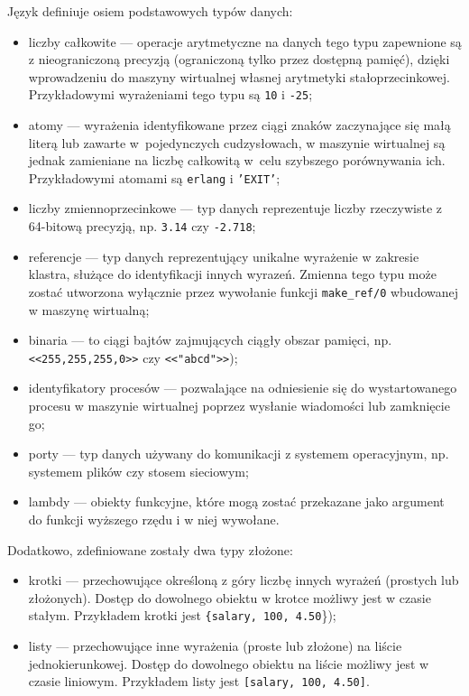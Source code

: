 Język definiuje osiem podstawowych typów danych:
\begin{itemize}
\item liczby całkowite --- operacje arytmetyczne na danych tego typu zapewnione są z nieograniczoną precyzją (ograniczoną tylko przez dostępną pamięć), dzięki wprowadzeniu do maszyny wirtualnej własnej arytmetyki stałoprzecinkowej. Przykładowymi wyrażeniami tego typu są \texttt{10} i \texttt{-25};
\item atomy --- wyrażenia identyfikowane przez ciągi znaków zaczynające się małą literą lub zawarte w~pojedynczych cudzysłowach, w maszynie wirtualnej są jednak zamieniane na liczbę całkowitą w~celu szybszego porównywania ich. Przykładowymi atomami są \texttt{erlang} i \texttt{'EXIT'};
\item liczby zmiennoprzecinkowe --- typ danych reprezentuje liczby rzeczywiste z 64-bitową precyzją, np. \texttt{3.14} czy \texttt{-2.718};
\item referencje --- typ danych reprezentujący unikalne wyrażenie w zakresie klastra, służące do identyfikacji innych wyrazeń. Zmienna tego typu może zostać utworzona wyłącznie przez wywołanie funkcji \texttt{make\_ref/0} wbudowanej w maszynę wirtualną;
\item binaria --- to ciągi bajtów zajmujących ciągły obszar pamięci, np. \texttt{<<255,255,255,0>>} czy \texttt{<<"abcd">>}); 
\item identyfikatory procesów --- pozwalające na odniesienie się do wystartowanego procesu w maszynie wirtualnej poprzez wysłanie wiadomości lub zamknięcie go;
\item porty --- typ danych używany do komunikacji z systemem operacyjnym, np. systemem plików czy stosem sieciowym;
\item lambdy --- obiekty funkcyjne, które mogą zostać przekazane jako argument do funkcji wyższego rzędu i w niej wywołane.
\end{itemize}

Dodatkowo, zdefiniowane zostały dwa typy złożone:
\begin{itemize}
\item krotki --- przechowujące określoną z góry liczbę innych wyrażeń (prostych lub złożonych). Dostęp do dowolnego obiektu w krotce możliwy jest w czasie stałym. Przykładem krotki jest \texttt{\{salary, 100, 4.50}\});
\item listy --- przechowujące inne wyrażenia (proste lub złożone) na liście jednokierunkowej. Dostęp do dowolnego obiektu na liście możliwy jest w czasie liniowym. Przykładem listy jest \texttt{[salary, 100, 4.50]}.
\end{itemize}

